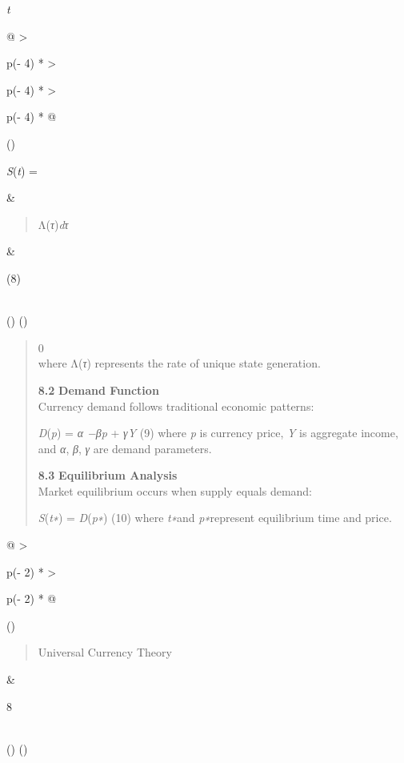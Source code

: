 \documentclass[
]{article}
\begin{document}
\emph{t}

\begin{longtable}[]{@{}
  >{\raggedright\arraybackslash}p{(\columnwidth - 4\tabcolsep) * }
  >{\raggedright\arraybackslash}p{(\columnwidth - 4\tabcolsep) * }
  >{\raggedright\arraybackslash}p{(\columnwidth - 4\tabcolsep) * }@{}}
\toprule()
\begin{minipage}[b]{\linewidth}\raggedright
\emph{S}(\emph{t}) =
\end{minipage} & \begin{minipage}[b]{\linewidth}\raggedright
\begin{quote}
Λ(\emph{τ})\emph{dτ}
\end{quote}
\end{minipage} & \begin{minipage}[b]{\linewidth}\raggedright
(8)
\end{minipage} \\
\midrule()
\endhead
\bottomrule()
\end{longtable}

\begin{quote}
0\\
where Λ(\emph{τ}) represents the rate of unique state generation.

\textbf{8.2} \textbf{Demand Function}\\
Currency demand follows traditional economic patterns:

\emph{D}(\emph{p}) = \emph{α −βp} + \emph{γY} (9) where \emph{p} is
currency price, \emph{Y} is aggregate income, and \emph{α}, \emph{β},
\emph{γ} are demand parameters.

\textbf{8.3} \textbf{Equilibrium Analysis}\\
Market equilibrium occurs when supply equals demand:

\emph{S}(\emph{t∗}) = \emph{D}(\emph{p∗}) (10) where \emph{t∗}and
\emph{p∗}represent equilibrium time and price.
\end{quote}

\begin{longtable}[]{@{}
  >{\raggedright\arraybackslash}p{(\columnwidth - 2\tabcolsep) * }
  >{\raggedright\arraybackslash}p{(\columnwidth - 2\tabcolsep) * }@{}}
\toprule()
\begin{minipage}[b]{\linewidth}\raggedright
\begin{quote}
Universal Currency Theory
\end{quote}
\end{minipage} & \begin{minipage}[b]{\linewidth}\raggedright
8
\end{minipage} \\
\midrule()
\endhead
\bottomrule()
\end{longtable}
\end{document}
